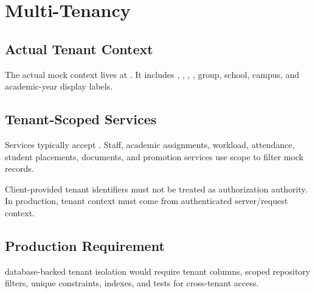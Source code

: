 \chapter{Multi-Tenancy}
\section{Actual Tenant Context}
The actual mock context lives at . It includes , , , , group, school, campus, and academic-year display labels.

\section{Tenant-Scoped Services}
Services typically accept . Staff, academic assignments, workload, attendance, student placements, documents, and promotion services use scope to filter mock records.

\begin{securitybox}
Client-provided tenant identifiers must not be treated as authorization authority. In production, tenant context must come from authenticated server/request context.
\end{securitybox}

\section{Production Requirement}
\future{} database-backed tenant isolation would require tenant columns, scoped repository filters, unique constraints, indexes, and tests for cross-tenant access.
